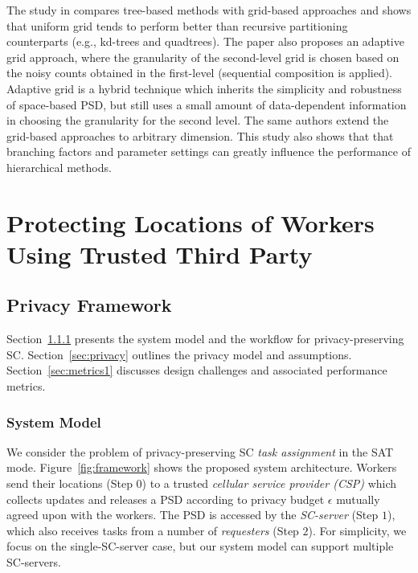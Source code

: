 \documentclass{USC-Thesis}
\numberwithin{equation}{chapter}
\begin{document}
The study in \cite{qardaji2012differentially} compares tree-based methods with grid-based approaches and shows that uniform grid tends to perform better than recursive partitioning counterparts (e.g., kd-trees and quadtrees). The paper also proposes an adaptive grid approach, where the granularity of the second-level grid is chosen based on the noisy counts obtained in the first-level (sequential composition is applied). Adaptive grid is a hybrid technique which inherits the simplicity and robustness of space-based PSD, but still uses a small amount of data-dependent information in choosing the granularity for the second level. The same authors \cite{qardaji2013understanding} extend the grid-based approaches to arbitrary dimension. This study also shows that that branching factors and parameter settings can greatly influence the performance of hierarchical methods.



\section{Protecting Locations of Workers Using Trusted Third Party}

\subsection{Privacy Framework}
\label{sec:fwork}
Section~\ref{sec:system1} presents the system model and the workflow for privacy-preserving SC.
Section~\ref{sec:privacy} outlines the privacy model and assumptions.  
Section~\ref{sec:metrics1} discusses design challenges and associated performance metrics.

\subsubsection{System Model}
\label{sec:system1}
We consider the problem of privacy-preserving SC {\em task assignment} in the SAT mode. Figure~\ref{fig:framework} shows the proposed system architecture. Workers send their locations (Step $0$) to a trusted {\em cellular service provider (CSP)} which collects updates and releases a PSD according to privacy budget $\epsilon$ mutually agreed upon with the workers. The PSD is accessed by the {\em SC-server} (Step $1$), which also receives tasks from a number of {\em requesters} (Step $2$). For simplicity, we focus on the single-SC-server case, but our system model can support multiple SC-servers.
\end{document}
